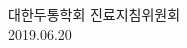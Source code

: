 \documentclass[12pt]{article} %
\begin{document}
\begin{titlepage}
{\LARGE 대한두통학회 진료지침위원회 \\ \vspace{20pt} \Large 2019.06.20 }\\[3cm] %



\vfill %

\end{titlepage}
\end{document}
